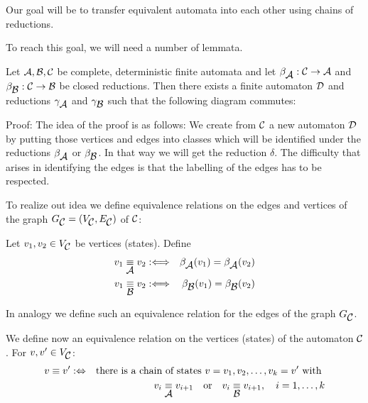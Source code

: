 Our goal will be to transfer equivalent automata into each other using chains of
reductions.

To reach this goal, we will need a number of lemmata.

\begin{lemma}
Let $\mbox{$\mathcal{A}$}, \mbox{$\mathcal{B}$}, \mbox{$\mathcal{C}$}$ be complete, deterministic finite automata and let
$\beta_{\mbox{$\mathcal{A}$}} : \mbox{$\mathcal{C}$} \to \mbox{$\mathcal{A}$}$ and $\beta_{\mbox{$\mathcal{B}$}} : \mbox{$\mathcal{C}$} \to \mbox{$\mathcal{B}$}$ be
closed reductions. Then there exists a finite automaton $\mbox{$\mathcal{D}$}$ and reductions
$\gamma_{\mbox{$\mathcal{A}$}}$ and $\gamma_{\mbox{$\mathcal{B}$}}$ such that the following diagram
commutes:

\begin{center}
\end{center}
\end{lemma}

Proof: The idea of the proof is as follows: We create from $\mbox{$\mathcal{C}$}$ a new
automaton $\mbox{$\mathcal{D}$}$ by putting those vertices and edges into classes which will
be identified under the reductions $\beta_{\mbox{$\mathcal{A}$}}$ or $\beta_{\mbox{$\mathcal{B}$}}$. In that
way we will get the reduction $\delta$. The difficulty that arises in
identifying the edges is that the labelling of the edges has to be respected.

To realize out idea we define equivalence relations on the edges and vertices of
the graph $G_{\mbox{$\mathcal{C}$}} = (V_{\mbox{$\mathcal{C}$}}, E_{\mbox{$\mathcal{C}$}})$ of $\mbox{$\mathcal{C}$}$:

Let $v_1, v_2 \in V_{\mbox{$\mathcal{C}$}}$ be vertices (states). Define
\begin{eqnarray*}
v_1 \underset{\mbox{$\mathcal{A}$}}{\equiv} v_2 & : \Longleftrightarrow & \beta_{\mbox{$\mathcal{A}$}}(v_1) =
\beta_{\mbox{$\mathcal{A}$}}(v_2) \\
v_1 \underset{\mbox{$\mathcal{B}$}}{\equiv} v_2 & : \Longleftrightarrow & \beta_{\mbox{$\mathcal{B}$}}(v_1) =
\beta_{\mbox{$\mathcal{B}$}}(v_2)
\end{eqnarray*}

In analogy we define such an equivalence relation for the edges of the graph
$G_{\mbox{$\mathcal{C}$}}$.

We define now an equivalence relation on the vertices (states) of the automaton
$\mbox{$\mathcal{C}$}$. For $v, v' \in V_{\mbox{$\mathcal{C}$}}$:
\begin{eqnarray*}
v \equiv v' & :\Leftrightarrow & \mbox{there is a chain of states } v = v_1,
v_2, \ldots, v_k = v'\mbox{ with } \\
& & v_i \underset{\mbox{$\mathcal{A}$}}{\equiv} v_{i+1}\mbox{\quad or\quad }v_i \underset{\mbox{$\mathcal{B}$}}{\equiv} v_{i+1},\quad i
= 1, \ldots, k
\end{eqnarray*} 

